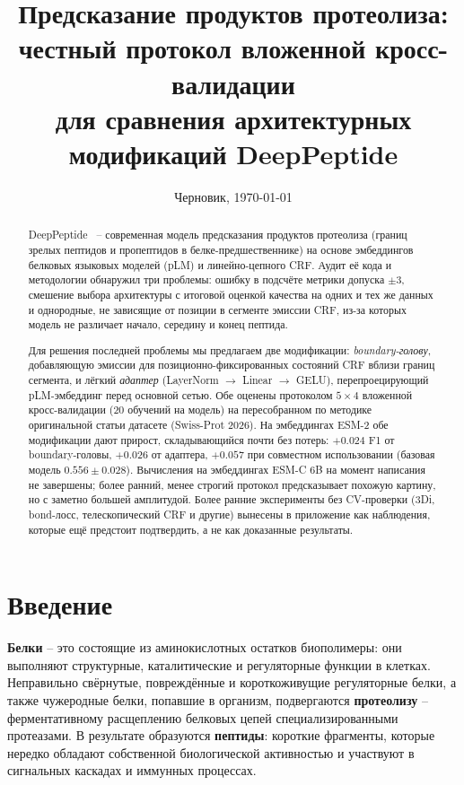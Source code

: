 \documentclass{article}
\title{Предсказание продуктов протеолиза: честный протокол вложенной кросс-валидации\\ \large для сравнения архитектурных модификаций DeepPeptide}
\author{}
\date{Черновик, \today}
\begin{document}
\maketitle

\begin{abstract}
DeepPeptide~\cite{deeppeptide2023} -- современная модель предсказания продуктов протеолиза (границ зрелых пептидов и пропептидов в белке-предшественнике) на основе эмбеддингов белковых языковых моделей (pLM) и линейно-цепного CRF. Аудит её кода и методологии обнаружил три проблемы: ошибку в подсчёте метрики допуска $\pm3$, смешение выбора архитектуры с итоговой оценкой качества на одних и тех же данных и однородные, не зависящие от позиции в сегменте эмиссии CRF, из-за которых модель не различает начало, середину и конец пептида.

Для решения последней проблемы мы предлагаем две модификации: \emph{boundary-голову}, добавляющую эмиссии для позиционно-фиксированных состояний CRF вблизи границ сегмента, и лёгкий \emph{адаптер} (LayerNorm $\to$ Linear $\to$ GELU), перепроецирующий pLM-эмбеддинг перед основной сетью. Обе оценены протоколом $5\times4$ вложенной кросс-валидации (20 обучений на модель) на пересобранном по методике оригинальной статьи датасете (Swiss-Prot 2026). На эмбеддингах ESM-2 обе модификации дают прирост, складывающийся почти без потерь: $+0.024$ F1 от boundary-головы, $+0.026$ от адаптера, $+0.057$ при совместном использовании (базовая модель $0.556\pm0.028$). Вычисления на эмбеддингах ESM-C 6B на момент написания не завершены; более ранний, менее строгий протокол предсказывает похожую картину, но с заметно большей амплитудой. Более ранние эксперименты без CV-проверки (3Di, bond-лосс, телескопический CRF и другие) вынесены в приложение как наблюдения, которые ещё предстоит подтвердить, а не как доказанные результаты.
\end{abstract}

\section{Введение}

\textbf{Белки} -- это состоящие из аминокислотных остатков биополимеры: они выполняют структурные, каталитические и регуляторные функции в клетках. Неправильно свёрнутые, повреждённые и короткоживущие регуляторные белки, а также чужеродные белки, попавшие в организм, подвергаются \textbf{протеолизу} -- ферментативному расщеплению белковых цепей специализированными протеазами. В результате образуются \textbf{пептиды}: короткие фрагменты, которые нередко обладают собственной биологической активностью и участвуют в сигнальных каскадах и иммунных процессах.
\end{document}
